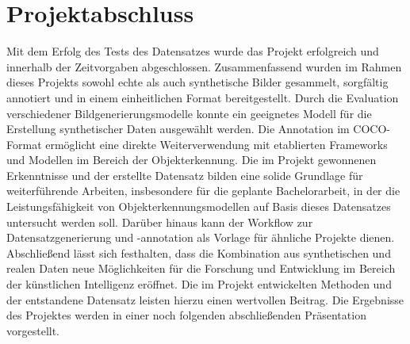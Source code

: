 \section{Projektabschluss}
Mit dem Erfolg des Tests des Datensatzes wurde das Projekt erfolgreich und innerhalb der Zeitvorgaben abgeschlossen. 
Zusammenfassend wurden im Rahmen dieses Projekts sowohl echte als auch synthetische Bilder gesammelt, sorgfältig annotiert und in einem einheitlichen Format bereitgestellt. Durch die Evaluation verschiedener Bildgenerierungsmodelle konnte ein geeignetes Modell für die Erstellung synthetischer Daten ausgewählt werden. Die Annotation im COCO-Format ermöglicht eine direkte Weiterverwendung mit etablierten Frameworks und Modellen im Bereich der Objekterkennung.
Die im Projekt gewonnenen Erkenntnisse und der erstellte Datensatz bilden eine solide Grundlage für weiterführende Arbeiten, insbesondere für die geplante Bachelorarbeit, in der die Leistungsfähigkeit von Objekterkennungsmodellen auf Basis dieses Datensatzes untersucht werden soll. Darüber hinaus kann der Workflow zur Datensatzgenerierung und -annotation als Vorlage für ähnliche Projekte dienen.
Abschließend lässt sich festhalten, dass die Kombination aus synthetischen und realen Daten neue Möglichkeiten für die Forschung und Entwicklung im Bereich der künstlichen Intelligenz eröffnet. Die im Projekt entwickelten Methoden und der entstandene Datensatz leisten hierzu einen wertvollen Beitrag.
Die Ergebnisse des Projektes werden in einer noch folgenden abschließenden Präsentation vorgestellt.
